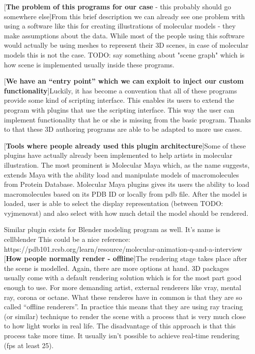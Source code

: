 \documentclass[
  digital, %
  table,   %
  nolof,     %
  nolot,     %
]{fithesis3}
\begin{document}
[\textbf{The problem of this programs for our case} - this probably should go somewhere else]From this brief description we can already see one problem with using a software like this for creating illustrations of molecular models - they make assumptions about the data. While most of the people using this software would actually be using meshes to represent their 3D scenes, in case of molecular models this is not the case. TODO: say something about "scene graph" which is how scene is implemented usually inside these programs.

[\textbf{We have an ``entry point'' which we can exploit to inject our custom functionality}]Luckily, it has become a convention that all of these programs provide some kind of scripting interface. This enables its users to extend the program with plugins that use the scripting interface. This way the user can implement functionality that he or she is missing from the basic program. Thanks to that these 3D authoring programs are able to be adapted to more use cases.

[\textbf{Tools where people already used this plugin architecture}]Some of these plugins have actually already been implemented to help artists in molecular illustration. The most prominent is Molecular Maya which, as the name suggests, extends Maya with the ability load and manipulate models of macromolecules from Protein Database. Molecular Maya plugins gives its users the ability to load macromolecules based on its PDB ID or locally from pdb file. After the model is loaded, user is able to select the display representation (between TODO: vyjmenovat) and also select with how much detail the model should be rendered.

Similar plugin exists for Blender modeling program as well. It's name is cellblender
This could be a nice reference: https://pdb101.rcsb.org/learn/resource/molecular-animation-q-and-a-interview
[\textbf{How people normally render - offline}]The rendering stage takes place after the scene is modelled. Again, there are more options at hand. 3D packages usually come with a default rendering solution which is for the most part good enough to use. For more demanding artist, external renderers like vray, mental ray, corona or octane. What these renderes have in common is that they are so called ``offline renderers''. In practice this means that they are using ray tracing (or similar) technique to render the scene with a process that is very much close to how light works in real life. The disadvantage of this approach is that this process take more time. It usually isn't possible to achieve real-time rendering (fps at least 25).
\end{document}
